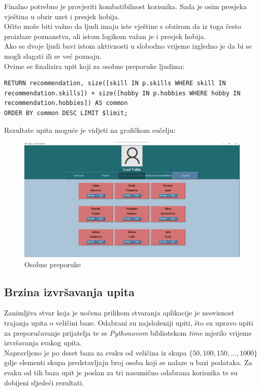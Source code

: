 \documentclass[titlepage, 12pt]{scrartcl}
\begin{document}
Finalno potrebno je provjeriti kombatibilnost korisnika. Sada je osim presjeka vještina u obzir uzet i presjek hobija. \\
Očito može biti važno da ljudi imaju iste vještine s obzirom da iz toga često proizlaze poznanstva, ali istom logikom važan je i presjek hobija. \\
Ako se dvoje ljudi bavi istom aktivnosti u slobodno vrijeme izgledno je da bi se mogli slagati ili se već poznaju. \\
Ovime se finalizira upit koji za osobne preporuke ljudima:
\begin{samepage}
\begin{verbatim}
RETURN recommendation, size([skill IN p.skills WHERE skill IN recommendation.skills]) + size([hobby IN p.hobbies WHERE hobby IN recommendation.hobbies]) AS common 
ORDER BY common DESC LIMIT $limit;

\end{verbatim}
\end{samepage}
\newpage
\begin{samepage}
Rezultate upita moguće je vidjeti na grafičkom sučelju:
\begin{figure}[h]
    \centering
    \includegraphics[scale=0.19]{slike/personal.jpg}
    \caption{Osobne preporuke}
    \label{fig:personal_rec}
\end{figure}
\end{samepage}

\subsection{Brzina izvršavanja upita}
Zanimljiva stvar koja je uočena prilikom stvaranja aplikacije je neovisnost trajanja upita o veličini baze. Odabrani su najsloženiji upiti, što su upravo upiti za preporučavanje prijatelja te se \emph{Pythonovom} bibliotekom \emph{time} mjerilo vrijeme izvršavanja svakog upita. \\
Napravljeno je po deset baza za svaku od veličina iz skupa $\{50, 100, 150, \dots, 1000\}$ gdje elementi skupa predstavljaju broj osoba koji se nalaze u bazi podataka. Za svaku od tih baza upit je poslan za tri nasumično odabrana korisnika te su dobijeni sljedeći rezultati.\\
\end{document}

